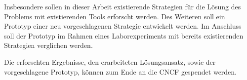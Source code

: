 \noindent
Insbesondere sollen in dieser Arbeit
existierende Strategien für die Lösung des Problems
mit existierenden Tools erforscht werden.
Des Weiteren soll ein Prototyp einer neu vorgeschlagenen
Strategie entwickelt werden.
Im Anschluss soll der Prototyp im Rahmen eines Laborexperiments
mit bereits existierenden Strategien
verglichen werden.
\bigskip


\noindent
Die erforschten Ergebnisse,
den erarbeiteten Lösungsansatz,
sowie der vorgeschlagene Prototyp,
können zum Ende
an die CNCF gespendet werden.
